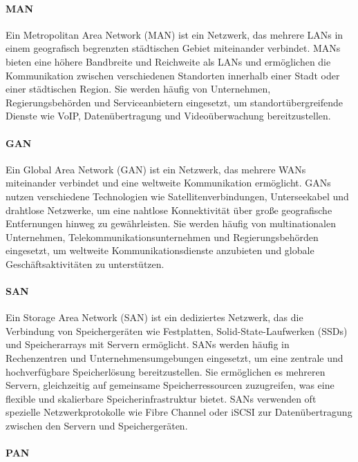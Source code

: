 \paragraph{MAN}

Ein Metropolitan Area Network (MAN) ist ein Netzwerk, das mehrere LANs in einem geografisch begrenzten städtischen Gebiet miteinander verbindet. MANs bieten eine höhere Bandbreite und Reichweite als LANs und ermöglichen die Kommunikation zwischen verschiedenen Standorten innerhalb einer Stadt oder einer städtischen Region. Sie werden häufig von Unternehmen, Regierungsbehörden und Serviceanbietern eingesetzt, um standortübergreifende Dienste wie VoIP, Datenübertragung und Videoüberwachung bereitzustellen.

\paragraph{GAN}

Ein Global Area Network (GAN) ist ein Netzwerk, das mehrere WANs miteinander verbindet und eine weltweite Kommunikation ermöglicht. GANs nutzen verschiedene Technologien wie Satellitenverbindungen, Unterseekabel und drahtlose Netzwerke, um eine nahtlose Konnektivität über große geografische Entfernungen hinweg zu gewährleisten. Sie werden häufig von multinationalen Unternehmen, Telekommunikationsunternehmen und Regierungsbehörden eingesetzt, um weltweite Kommunikationsdienste anzubieten und globale Geschäftsaktivitäten zu unterstützen.

\paragraph{SAN}

Ein Storage Area Network (SAN) ist ein dediziertes Netzwerk, das die Verbindung von Speichergeräten wie Festplatten, Solid-State-Laufwerken (SSDs) und Speicherarrays mit Servern ermöglicht. SANs werden häufig in Rechenzentren und Unternehmensumgebungen eingesetzt, um eine zentrale und hochverfügbare Speicherlösung bereitzustellen. Sie ermöglichen es mehreren Servern, gleichzeitig auf gemeinsame Speicherressourcen zuzugreifen, was eine flexible und skalierbare Speicherinfrastruktur bietet. SANs verwenden oft spezielle Netzwerkprotokolle wie Fibre Channel oder iSCSI zur Datenübertragung zwischen den Servern und Speichergeräten.

\paragraph{PAN}

